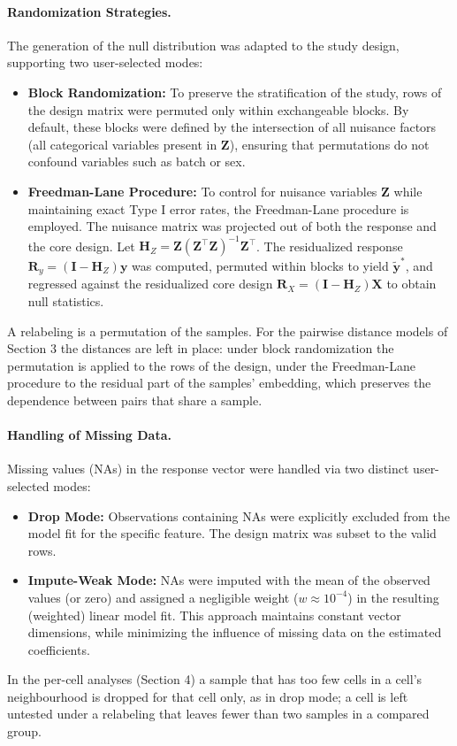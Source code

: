 \documentclass{article}
\begin{document}
\paragraph{Randomization Strategies.}
The generation of the null distribution was adapted to the study design, supporting two user-selected modes:
\begin{itemize}
    \item \textbf{Block Randomization:} To preserve the stratification of the study, rows of the design matrix were permuted only within exchangeable blocks. By default, these blocks were defined by the intersection of all nuisance factors (all categorical variables present in $\mathbf{Z}$), ensuring that permutations do not confound variables such as batch or sex.
    \item \textbf{Freedman-Lane Procedure:} To control for nuisance variables $\mathbf{Z}$ while maintaining exact Type I error rates, the Freedman-Lane procedure is employed. The nuisance matrix was projected out of both the response and the core design. Let $\mathbf{H}_Z = \mathbf{Z}(\mathbf{Z}^\top \mathbf{Z})^{-1}\mathbf{Z}^\top$. The residualized response $\mathbf{R}_y = (\mathbf{I} - \mathbf{H}_Z)\mathbf{y}$ was computed, permuted within blocks to yield $\tilde{\mathbf{y}}^*$, and regressed against the residualized core design $\mathbf{R}_X = (\mathbf{I} - \mathbf{H}_Z)\mathbf{X}$ to obtain null statistics.
\end{itemize}
A relabeling is a permutation of the samples. For the pairwise distance models of Section 3 the distances are left in place: under block randomization the permutation is applied to the rows of the design, under the Freedman-Lane procedure to the residual part of the samples' embedding, which preserves the dependence between pairs that share a sample.

\paragraph{Handling of Missing Data.}
Missing values (NAs) in the response vector were handled via two distinct user-selected modes:
\begin{itemize}
    \item \textbf{Drop Mode:} Observations containing NAs were explicitly excluded from the model fit for the specific feature. The design matrix was subset to the valid rows.
    \item \textbf{Impute-Weak Mode:} NAs were imputed with the mean of the observed values (or zero) and assigned a negligible weight ($w \approx 10^{-4}$) in the resulting (weighted) linear model fit. This approach maintains constant vector dimensions, while minimizing the influence of missing data on the estimated coefficients.
\end{itemize}
In the per-cell analyses (Section 4) a sample that has too few cells in a cell's neighbourhood is dropped for that cell only, as in drop mode; a cell is left untested under a relabeling that leaves fewer than two samples in a compared group.
\end{document}
